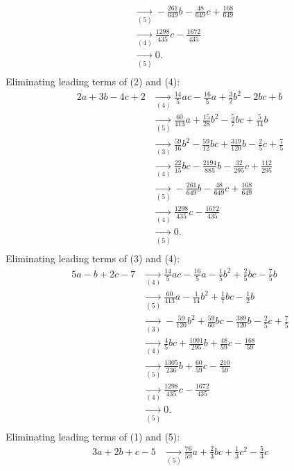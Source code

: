 {\begin{align*}
\\ &\underset{(5)}{\rightarrow}-\frac{261}{649}b-\frac{48}{649}c+\frac{168}{649}
\\ &\underset{(4)}{\rightarrow}\frac{1298}{435}c-\frac{1672}{435}
\\ &\underset{(5)}{\rightarrow}0
.\\ \end{align*}
Eliminating leading terms of (2) and (4):
\begin{align*}
2a+3b-4c+2&\underset{(4)}{\rightarrow}\frac{14}{5}ac-\frac{16}{5}a+\frac{3}{2}b^{2}-2bc+b
\\ &\underset{(5)}{\rightarrow}\frac{60}{413}a+\frac{15}{28}b^{2}-\frac{5}{7}bc+\frac{5}{14}b
\\ &\underset{(3)}{\rightarrow}\frac{59}{16}b^{2}-\frac{59}{12}bc+\frac{319}{120}b-\frac{2}{5}c+\frac{7}{5}
\\ &\underset{(4)}{\rightarrow}\frac{22}{15}bc-\frac{2194}{885}b-\frac{32}{295}c+\frac{112}{295}
\\ &\underset{(5)}{\rightarrow}-\frac{261}{649}b-\frac{48}{649}c+\frac{168}{649}
\\ &\underset{(4)}{\rightarrow}\frac{1298}{435}c-\frac{1672}{435}
\\ &\underset{(5)}{\rightarrow}0
.\\ \end{align*}
Eliminating leading terms of (3) and (4):
\begin{align*}
5a-b+2c-7&\underset{(4)}{\rightarrow}\frac{14}{5}ac-\frac{16}{5}a-\frac{1}{5}b^{2}+\frac{2}{5}bc-\frac{7}{5}b
\\ &\underset{(5)}{\rightarrow}\frac{60}{413}a-\frac{1}{14}b^{2}+\frac{1}{7}bc-\frac{1}{2}b
\\ &\underset{(3)}{\rightarrow}-\frac{59}{120}b^{2}+\frac{59}{60}bc-\frac{389}{120}b-\frac{2}{5}c+\frac{7}{5}
\\ &\underset{(4)}{\rightarrow}\frac{4}{5}bc+\frac{1001}{295}b+\frac{48}{59}c-\frac{168}{59}
\\ &\underset{(5)}{\rightarrow}\frac{1305}{236}b+\frac{60}{59}c-\frac{210}{59}
\\ &\underset{(4)}{\rightarrow}\frac{1298}{435}c-\frac{1672}{435}
\\ &\underset{(5)}{\rightarrow}0
.\\ \end{align*}
Eliminating leading terms of (1) and (5):
\begin{align*}
3a+2b+c-5&\underset{(5)}{\rightarrow}\frac{76}{59}a+\frac{2}{3}bc+\frac{1}{3}c^{2}-\frac{5}{3}c

\end{align*}}

